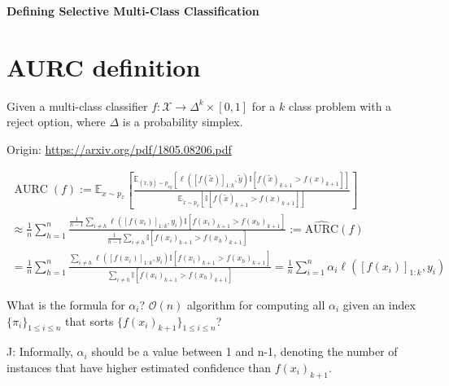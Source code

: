 \begin{center}{\noindent\Large\bf Defining Selective Multi-Class Classification}\end{center}

\section{AURC definition}

Given a multi-class classifier $f: \mathcal{X} \rightarrow \Delta^{k} \times [0,1]$ for a $k$ class problem with a reject option, where $\Delta$ is a probability simplex. %

\noindent Origin: \url{https://arxiv.org/pdf/1805.08206.pdf}

\begin{align}
    \operatorname{AURC}(f) := \mathbb{E}_{x \sim p_x} \left[  \frac{\mathbb{E}_{(\tilde{x},\tilde{y})\sim p_{xy}}[\ell([f(\tilde{x})]_{1:k},\tilde{y}) \mathbb{I}[f(\tilde{x})_{k+1} > f(x)_{k+1}]]}{\mathbb{E}_{\tilde{x}\sim p_{x}}[ \mathbb{I}[f(\tilde{x})_{k+1} > f(x)_{k+1}]]} \right] \\
    \approx \frac{1}{n} \sum_{h=1}^n \frac{\frac{1}{n-1} \sum_{i\neq h} \ell([f(x_i)]_{1:k},y_i) \mathbb{I}[f(x_i)_{k+1} > f(x_h)_{k+1}]}{\frac{1}{n-1} \sum_{i\neq h} \mathbb{I}[f(x_i)_{k+1} > f(x_h)_{k+1}]} := \widehat{\mathrm{AURC}}(f) \\
   =\frac{1}{n} \sum_{h=1}^n \frac{ \sum_{i\neq h} \ell([f(x_i)]_{1:k},y_i) \mathbb{I}[f(x_i)_{k+1} > f(x_h)_{k+1}]}{ \sum_{i\neq h} \mathbb{I}[f(x_i)_{k+1} > f(x_h)_{k+1}]} = \frac{1}{n} \sum_{i=1}^n \alpha_i \ell([f(x_i)]_{1:k},y_i)
\end{align}

What is the formula for $\alpha_i$?  $\mathcal{O}(n)$ algorithm for computing all $\alpha_i$ given an index $\{\pi_i\}_{1\leq i\leq n}$ that sorts $\{f(x_i)_{k+1}\}_{1\leq i \leq n}$?


J: Informally, $\alpha_i$ should be a value between 1 and n-1, denoting the number of instances that have higher estimated confidence than  $f(x_i)_{k+1}$.



